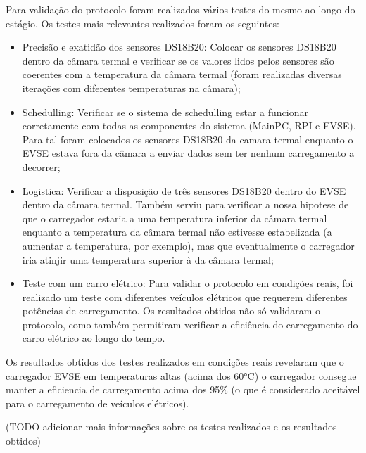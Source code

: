 Para validação do protocolo foram realizados vários testes do mesmo ao longo do estágio. Os testes mais relevantes realizados
foram os seguintes:
\begin{itemize}
    \item Precisão e exatidão dos sensores DS18B20: Colocar os sensores DS18B20 dentro da câmara termal e verificar se os valores lidos pelos sensores são 
    coerentes com a temperatura da câmara termal (foram realizadas diversas iterações com diferentes temperaturas na 
    câmara);
    \item Schedulling: Verificar se o sistema de schedulling estar a funcionar corretamente com todas as componentes do
    sistema (MainPC, RPI e EVSE). Para tal foram colocados os sensores DS18B20 da camara termal enquanto o EVSE estava fora da câmara
    a enviar dados sem ter nenhum carregamento a decorrer;
    \item Logistica: Verificar a disposição de três sensores DS18B20 dentro do EVSE dentro da câmara termal. Também serviu
    para verificar a nossa hipotese de que o carregador estaria a uma temperatura inferior da câmara termal enquanto a temperatura
    da câmara termal não estivesse estabelizada (a aumentar a temperatura, por exemplo), mas que eventualmente o carregador iria atinjir uma 
    temperatura superior à da câmara termal;
    \item Teste com um carro elétrico: Para validar o protocolo em condições reais, foi realizado um teste com diferentes
    veículos elétricos que requerem diferentes potências de carregamento. Os resultados obtidos não só validaram o protocolo, como também
    permitiram verificar a eficiência do carregamento do carro elétrico ao longo do tempo.
\end{itemize}

Os resultados obtidos dos testes realizados em condições reais revelaram que o carregador EVSE em temperaturas altas (acima dos 60°C)
o carregador consegue manter a eficiencia de carregamento acima dos 95\% (o que é considerado aceitável para o carregamento de veículos elétricos).

(TODO adicionar mais informações sobre os testes realizados e os resultados obtidos)

